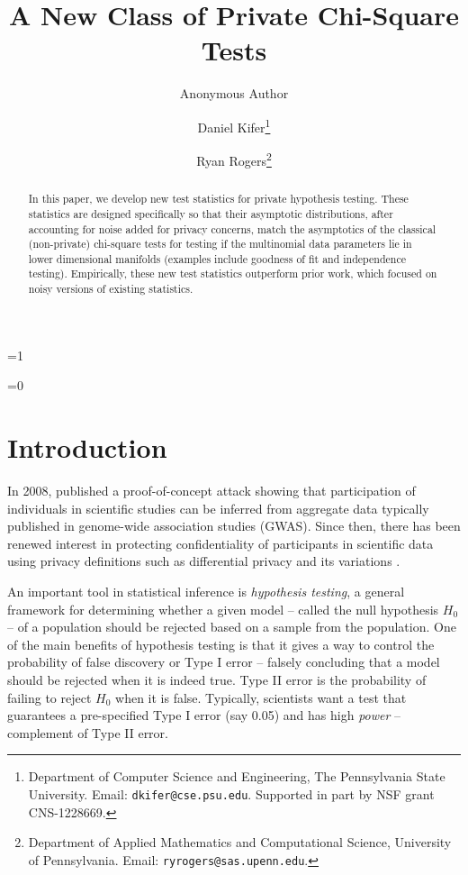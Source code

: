 \documentclass[twoside,letterpaper]{article} \usepackage{aistats2017}
\title{A New Class of Private Chi-Square Tests}
\author{ Anonymous Author }
\author{Daniel Kifer\thanks{Department of Computer Science and Engineering, The Pennsylvania State University.  Email: \texttt{dkifer@cse.psu.edu}.  Supported in part by NSF grant CNS-1228669.} \and Ryan Rogers\thanks{Department of Applied Mathematics and Computational Science, University of Pennsylvania. Email: \texttt{ryrogers@sas.upenn.edu}.}}
\theoremstyle{definition}
\theoremstyle{remark}
\begin{document}
=1

\else
\maketitle
\fi

\begin{abstract}
In this paper, we develop new test statistics for private hypothesis testing. These statistics are designed specifically so that their asymptotic distributions, after accounting for noise added for privacy concerns, match the asymptotics of the classical (non-private) chi-square tests for testing if the multinomial data parameters lie in lower dimensional manifolds (examples include goodness of fit and independence testing). Empirically, these new test statistics outperform prior work, which focused on noisy versions of existing statistics.
\end{abstract}
=0
\newpage
\tableofcontents
\newpage
\fi

\section{Introduction}
In 2008, \citet{Homer08} published a proof-of-concept attack showing that participation of individuals in scientific studies can be inferred from aggregate data typically published in genome-wide association studies (GWAS). Since then, there has been renewed interest in protecting confidentiality of participants in scientific data \cite{JS13,USF13,YFSU14,SSB16} using privacy definitions such as differential privacy and its variations \cite{DMNS06,DKMMN06,BS16,DR16}.

An important tool in statistical inference is \emph{hypothesis testing}, a general framework for determining whether a given model -- called the null hypothesis $H_0$ -- of a population should be rejected based on a sample from the population.  One of the main benefits of hypothesis testing is that it gives a way to control the probability of false discovery or Type I error -- falsely concluding that a model should be rejected when it is indeed true. 
Type II error is the probability of failing to reject $H_0$ when it is false. Typically, scientists want a test that guarantees a pre-specified Type I error (say 0.05) and has high \emph{power} -- complement of Type II error.
\end{document}
